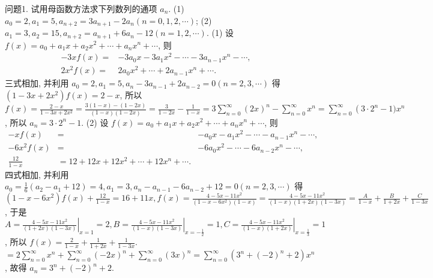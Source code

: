 
问题1. 试用母函数方法求下列数列的通项 $a_n$.
(1) $a_0=2, a_1=5, a_{n+2}=3 a_{n+1}-2 a_n(n=0,1,2, \cdots)$;
(2) $a_1=3, a_2=15, a_{n+2}=a_{n+1}+6 a_n-12(n=1,2, \cdots)$.
(1) 设 $f(x)=a_0+a_1 x+a_2 x^2+\cdots+a_n x^n+\cdots$, 则
$$
\begin{array}{rr}
-3 x f(x)= & -3 a_0 x-3 a_1 x^2-\cdots-3 a_{n-1} x^n-\cdots, \\
2 x^2 f(x)= & 2 a_0 x^2+\cdots+2 a_{n-1} x^n+\cdots .
\end{array}
$$
三式相加, 并利用 $a_0=2, a_1=5, a_n-3 a_{n-1}+2 a_{n-2}=0(n=2,3, \cdots)$
得 $\left(1-3 x+2 x^2\right) f(x)=2-x$, 所以 $f(x)=\frac{2-x}{1-3 x+2 x^2}= \frac{3(1-x)-(1-2 x)}{(1-x)(1-2 x)}=\frac{3}{1-2 x}-\frac{1}{1-x}=3 \sum_{n=0}^{\infty}(2 x)^n-\sum_{n=0}^{\infty} x^n=\sum_{n=0}^{\infty}\left(3 \cdot 2^n\right. -1) x^n$, 所以 $a_n=3 \cdot 2^n-1$.
(2) 设 $f(x)=a_0+a_1 x+a_2 x^2+\cdots+a_n x^n+\cdots$, 则
$$
\begin{array}{rlrl}
-x f(x) & = & -a_0 x-a_1 x^2-\cdots-a_{n-1} x^n-\cdots, \\
-6 x^2 f(x) & = & -6 a_0 x^2-\cdots-6 a_{n-2} x^n-\cdots, \\
\frac{12}{1-x} & =12+12 x+12 x^2+\cdots+12 x^n+\cdots .
\end{array}
$$
四式相加, 并利用 $a_0=\frac{1}{6}\left(a_2-a_1+12\right)=4, a_1=3, a_n-a_{n-1}-6 a_{n-2}+ 12=0(n=2,3, \cdots)$ 得 $\left(1-x-6 x^2\right) f(x)+\frac{12}{1-x}=16+11 x, f(x)= \frac{4-5 x-11 x^2}{\left(1-x-6 x^2\right)(1-x)}=\frac{4-5 x-11 x^2}{(1-x)(1+2 x)(1-3 x)}=\frac{A}{1-x}+\frac{B}{1+2 x}+ \frac{C}{1-3 x}$, 于是 $A=\left.\frac{4-5 x-11 x^2}{(1+2 x)(1-3 x)}\right|_{x=1}=2, B=\left.\frac{4-5 x-11 x^2}{(1-x)(1-3 x)}\right|_{x=-\frac{1}{2}} =1, C=\left.\frac{4-5 x-11 x^2}{(1-x)(1+2 x)}\right|_{x=\frac{1}{3}}=1$, 所以 $f(x)=\frac{2}{1-x}+\frac{1}{1+2 x}+\frac{1}{1-3 x}$. $=2 \sum_{n=0}^{\infty} x^n+\sum_{n=0}^{\infty}(-2 x)^n+\sum_{n=0}^{\infty}(3 x)^n=\sum_{n=0}^{\infty}\left(3^n+(-2)^n+2\right) x^n$, 故得 $a_n=3^n +(-2)^n+2$.



